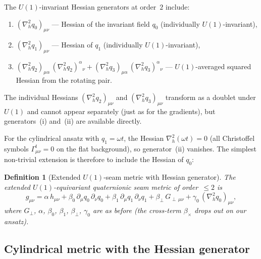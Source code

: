\documentclass[pdflatex,sn-mathphys-num]{sn-jnl}
\theoremstyle{thmstyleone}%
\theoremstyle{thmstyletwo}%
\theoremstyle{thmstylethree}%
\newtheorem{definition}[theorem]{Definition}
\newcommand{\pa}{\partial}
\newcommand{\nn}{\nabla}
\numberwithin{equation}{section}
\begin{document}
The $U(1)$-invariant Hessian generators at order~$2$ include:
\begin{enumerate}[noitemsep,label=(\roman*)]
\item $(\nn^2_h q_0)_{\mu\nu}$ --- Hessian of the invariant
  field $q_0$ (individually $U(1)$-invariant),
\item $(\nn^2_h q_1)_{\mu\nu}$ --- Hessian of $q_1$
  (individually $U(1)$-invariant),
\item $(\nn^2_h q_2)_{\mu\alpha}\,(\nn^2_h q_2)^\alpha{}_\nu
  + (\nn^2_h q_3)_{\mu\alpha}\,(\nn^2_h q_3)^\alpha{}_\nu$
  --- $U(1)$-averaged squared Hessian from the rotating pair.
\end{enumerate}
The individual Hessians $(\nn^2_h q_2)_{\mu\nu}$ and
$(\nn^2_h q_3)_{\mu\nu}$ transform as a doublet under $U(1)$
and cannot appear separately (just as for the gradients), but
generators~(i) and~(ii) are available directly.

For the cylindrical ansatz with $q_1 = \omega t$, the Hessian
$\nn^2_h(\omega t) = 0$ (all Christoffel symbols
$\Gamma^t_{\mu\nu} = 0$ on the flat background), so
generator~(ii) vanishes.  The simplest non-trivial extension is
therefore to include the Hessian of $q_0$:

\begin{definition}[Extended $U(1)$-seam metric with Hessian
  generator]
\label{def:u1-seam-hessian}
The extended $U(1)$-equivariant quaternionic seam metric of
order~$\le 2$ is
\begin{equation}
\label{eq:u1-seam-hessian}
g_{\mu\nu}
= \alpha\,h_{\mu\nu}
  + \beta_0\,\pa_\mu q_0\,\pa_\nu q_0
  + \beta_1\,\pa_\mu q_1\,\pa_\nu q_1
  + \beta_\perp\,G_{\perp\,\mu\nu}
  + \gamma_0\,(\nn^2_h q_0)_{\mu\nu},
\end{equation}
where $G_\perp$, $\alpha$, $\beta_0$, $\beta_1$, $\beta_\perp$,
$\gamma_0$ are as before (the cross-term $\beta_\times$ drops
out on our ansatz).
\end{definition}

\subsection{Cylindrical metric with the Hessian generator}
\end{document}
